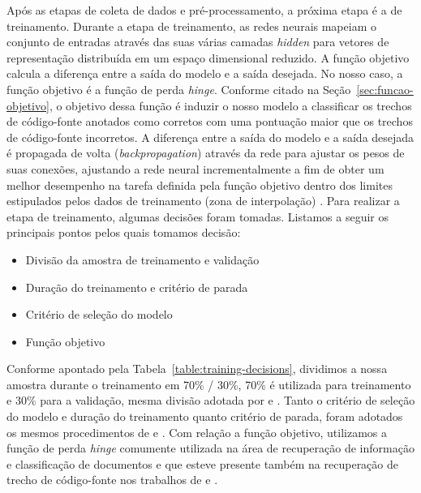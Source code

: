 Após as etapas de coleta de dados e pré-processamento, a próxima etapa é a de treinamento. Durante a etapa de treinamento, as redes neurais mapeiam o conjunto de entradas através das suas várias camadas \textit{hidden} para vetores de representação distribuída em um espaço dimensional reduzido. A função objetivo calcula a diferença entre a saída do modelo e a saída desejada. No nosso caso, a função objetivo é a função de perda \textit{hinge}. Conforme citado na Seção~\ref{sec:funcao-objetivo}, o objetivo dessa função é induzir o nosso modelo a classificar os trechos de código-fonte anotados como corretos com uma pontuação maior que os trechos de código-fonte incorretos. A diferença entre a saída do modelo e a saída desejada é propagada de volta (\textit{backpropagation}) através da rede para ajustar os pesos de suas conexões, ajustando a rede neural incrementalmente a fim de obter um melhor desempenho na tarefa definida pela função objetivo dentro dos limites estipulados pelos dados de treinamento (zona de interpolação) \citep{hasson-direct-fit-to-nature-evolutionary-perspective-ann:2020}. Para realizar a etapa de treinamento, algumas decisões foram tomadas. Listamos a seguir os principais pontos pelos quais tomamos decisão:

\begin{itemize}
    \item Divisão da amostra de treinamento e validação
    \item Duração do treinamento e critério de parada
    \item Critério de seleção do modelo
    \item Função objetivo
\end{itemize}

Conforme apontado pela Tabela~\ref{table:training-decisions}, dividimos a nossa amostra durante o treinamento em 70\% / 30\%, 70\% é utilizada para treinamento e 30\% para a validação, mesma divisão adotada por \cite{yao-2018} e \cite{cambronero-deep-learning-code-search:2019}. Tanto o critério de seleção do modelo e duração do treinamento quanto critério de parada, foram adotados os mesmos procedimentos de \cite{iyer-etal-2016-summarizing} e \cite{yao-2018}. Com relação a função objetivo, utilizamos a função de perda \textit{hinge} comumente utilizada na área de recuperação de informação e classificação de documentos e que esteve presente também na recuperação de trecho de código-fonte nos trabalhos de \cite{Gu-deep-code-search:2018} e \cite{cambronero-deep-learning-code-search:2019}.


